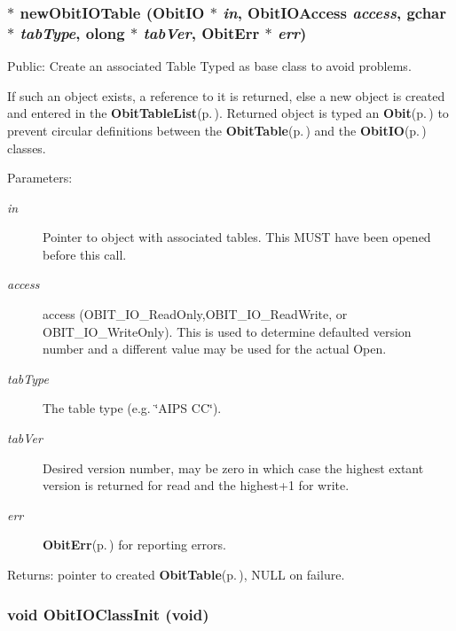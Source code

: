 \subsubsection{$\ast$ new\-Obit\-IOTable ({\bf Obit\-IO} $\ast$ {\em in}, Obit\-IOAccess {\em access}, gchar $\ast$ {\em tab\-Type}, {\bf olong} $\ast$ {\em tab\-Ver}, {\bf Obit\-Err} $\ast$ {\em err})}\label{ObitIO_8h_a53}


Public: Create an associated Table Typed as base class to avoid problems. 

If such an object exists, a reference to it is returned, else a new object is created and entered in the {\bf Obit\-Table\-List}{\rm (p.\,\pageref{structObitTableList})}. Returned object is typed an {\bf Obit}{\rm (p.\,\pageref{structObit})} to prevent circular definitions between the {\bf Obit\-Table}{\rm (p.\,\pageref{structObitTable})} and the {\bf Obit\-IO}{\rm (p.\,\pageref{structObitIO})} classes. \begin{Desc}
\item[Parameters:]
\begin{description}
\item[{\em in}]Pointer to object with associated tables. This MUST have been opened before this call. \item[{\em access}]access (OBIT\_\-IO\_\-Read\-Only,OBIT\_\-IO\_\-Read\-Write, or OBIT\_\-IO\_\-Write\-Only). This is used to determine defaulted version number and a different value may be used for the actual Open. \item[{\em tab\-Type}]The table type (e.g. \char`\"{}AIPS CC\char`\"{}). \item[{\em tab\-Ver}]Desired version number, may be zero in which case the highest extant version is returned for read and the highest+1 for write. \item[{\em err}]{\bf Obit\-Err}{\rm (p.\,\pageref{structObitErr})} for reporting errors. \end{description}
\end{Desc}
\begin{Desc}
\item[Returns:]pointer to created {\bf Obit\-Table}{\rm (p.\,\pageref{structObitTable})}, NULL on failure. \end{Desc}
\subsubsection{\setlength{\rightskip}{0pt plus 5cm}void Obit\-IOClass\-Init (void)}\label{ObitIO_8h_a28}


